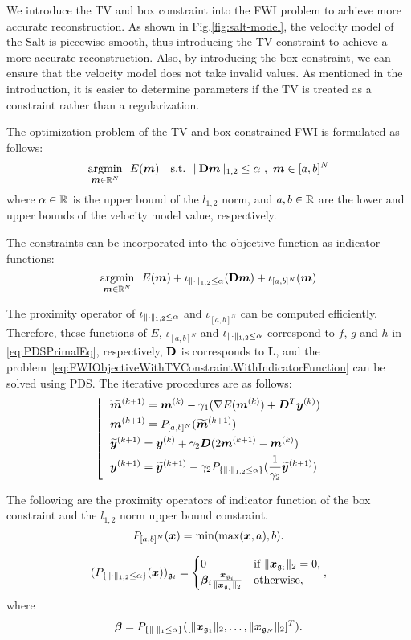 We introduce the TV and box constraint into the FWI problem to achieve more accurate reconstruction.
As shown in Fig.\ref{fig:salt-model}, the velocity model of the Salt is piecewise smooth, thus introducing the TV constraint to achieve a more accurate reconstruction.
Also, by introducing the box constraint, we can ensure that the velocity model does not take invalid values.
As mentioned in the introduction, it is easier to determine parameters if the TV is treated as a constraint rather than a regularization.

The optimization problem of the TV and box constrained FWI is formulated as follows:
\begin{equation} \label{eq:FWIObjectiveWithTVConstraint} \argmin{\velModel \in \realNumber^N} \ \ \FWIObjectiveWithTVConstraint \end{equation}
where $\alpha \in \mathbb{R}$ is the upper bound of the $l_{1,2}$ norm, and $a, b \in \mathbb{R}$ are the lower and upper bounds of the velocity model value, respectively.

The constraints can be incorporated into the objective function as indicator functions:
\begin{equation} \label{eq:FWIObjectiveWithTVConstraintWithIndicatorFunction} \argmin{\velModel \in \realNumber^N} \ \ \FWIObjectiveWithTVConstraintWithIndicatorFunction \end{equation}

The proximity operator of $\iota_{\lVert \cdot \rVert _{1,2} \le \alpha}$ and $\iota_{[a,b]^N}$ can be computed efficiently.
Therefore, these functions of $E$, $\iota_{[a,b]^N}$ and $\iota_{\lVert \cdot \rVert _{1,2} \le \alpha}$ correspond to $f$, $g$ and $h$ in \eqref{eq:PDSPrimalEq}, respectively, $\mathbf{D}$ is corresponds to $\bm{L}$, and the problem~\eqref{eq:FWIObjectiveWithTVConstraintWithIndicatorFunction} can be solved using PDS.
The iterative procedures are as follows:
\begin{equation} \label{eq:FWIWithPDS} \left \lfloor \ \ \begin{aligned} & \widetilde{\bm{m}}^{(k+1)} = \bm{m}^{(k)} - \gamma_1( \nabla E(\bm{m}^{(k)}) + \bm{D}^T \bm{y}^{(k)} ) \\ & \bm{m}^{(k+1)} = P_{[a,b]^N}(\widetilde{\bm{m}}^{(k+1)}) \\ & \widetilde{\bm{y}}^{(k+1)} = \bm{y}^{(k)} + \gamma_2 \bm{D} (2\bm{m}^{(k+1)} - \bm{m}^{(k)}) \\ & \bm{y}^{(k+1)} = \widetilde{\bm{y}}^{(k+1)} - \gamma_2 P_{ \{ \lVert  \cdot  \rVert _{1,2} \le \alpha \} }(\frac 1 {\gamma_2} {\widetilde{\bm y}^{(k+1)}}) \end{aligned} \right. \notag \end{equation}


The following are the proximity operators of indicator function of the box constraint and the $l_{1,2}$ norm upper bound constraint.
\begin{equation} \label{eq:ProximityOperatorForBoxConstraint} P_{[a,b]^N}(\bm{x}) = \text{min}( \text{max} (\bm{x}, a), b). \end{equation}

\begin{equation} \label{eq:ProximityOperatorForL12Ball} (P_{ \{ \lVert  \cdot  \rVert _{1,2} \le \alpha \} }(\bm{x}))_{\mathfrak{g}_i} = \begin{cases} 0 & \text{if} \ \lVert \bm{x}_{\mathfrak{g}_i} \rVert _2 = 0, \\ \bm \beta_i \frac {\bm{x}_{\mathfrak{g}_i}} {\lVert \bm{x}_{\mathfrak{g}_i} \rVert _2} & \text{otherwise}, \end{cases} \\ , \end{equation}
where
\begin{equation} \label{eq:ProximityOperatorForL12BallWhere} \bm \beta = P_{ \{ \lVert  \cdot  \rVert _1 \le \alpha \} }({[ \lVert  \bm{x}_{\mathfrak{g}_1}  \rVert _2, \ldots, \lVert  \bm{x}_{\mathfrak{g}_N}  \rVert _2 ]^T}). \\  \notag \end{equation}

